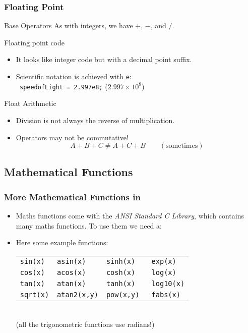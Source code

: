 \documentclass[smaller,table]{beamer} %
\begin{document}
\begin{frame}
\frametitle{Floating Point}
\begin{block}{Base Operators}
As with integers, we have $+$, $-$, {\tt *} and $/$.
\end{block}

\begin{block}{Floating point code}
\begin{itemize}
\item It looks like integer code but with a decimal point suffix.
\item Scientific notation is achieved with {\tt e}:\\
{\tt {} speedofLight = 2.997e8;} ($2.997 \times 10^8$)
\end{itemize}
\end{block}

\begin{block}{Float Arithmetic}
\begin{itemize}
\item Division is not always the reverse of multiplication.
\item Operators may not be commutative!
$$ A + B + C \neq A + C + B \qquad \mathrm{(sometimes)}$$
\end{itemize}
\end{block}
\end{frame}

\subsection{Mathematical Functions}
\begin{frame}
\frametitle{More Mathematical Functions in }
\begin{itemize}
\item Maths functions come with the \emph{ANSI Standard C Library}, which contains many maths functions. To use them we need a:
{\tt {} }
\item Here some example functions:
\begin{tabular}{l l l l}
\tt sin(x)&\tt asin(x) & \tt sinh(x) & \tt exp(x)\\
\tt cos(x)&\tt acos(x) & \tt cosh(x) & \tt log(x)\\
\tt tan(x)&\tt atan(x) & \tt tanh(x) & \tt log10(x)\\
\tt sqrt(x)&\tt atan2(x,y)&\tt pow(x,y) & \tt fabs(x)
\end{tabular}\\
\vspace{1ex}
(all the trigonometric functions use radians!)
\end{itemize}
\end{frame}
\end{document}
